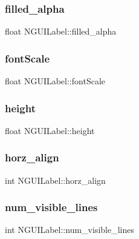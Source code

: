 \subsubsection{\texorpdfstring{filled\+\_\+alpha}{filled\_alpha}}
{\footnotesize\ttfamily float N\+G\+U\+I\+Label\+::filled\+\_\+alpha}

\hypertarget{class_n_g_u_i_label_a61a74ff519ffe248db800fa66d61d098}{}\label{class_n_g_u_i_label_a61a74ff519ffe248db800fa66d61d098} 
\subsubsection{\texorpdfstring{font\+Scale}{fontScale}}
{\footnotesize\ttfamily float N\+G\+U\+I\+Label\+::font\+Scale}

\hypertarget{class_n_g_u_i_label_a9a01323d0e84f4df900d32c06e7270c4}{}\label{class_n_g_u_i_label_a9a01323d0e84f4df900d32c06e7270c4} 
\subsubsection{\texorpdfstring{height}{height}}
{\footnotesize\ttfamily float N\+G\+U\+I\+Label\+::height}

\hypertarget{class_n_g_u_i_label_af1b9cbc5b3c81cb525d265e70b72e2e3}{}\label{class_n_g_u_i_label_af1b9cbc5b3c81cb525d265e70b72e2e3} 
\subsubsection{\texorpdfstring{horz\+\_\+align}{horz\_align}}
{\footnotesize\ttfamily int N\+G\+U\+I\+Label\+::horz\+\_\+align}

\hypertarget{class_n_g_u_i_label_ae08fde6a71a4015f873b2578e555a334}{}\label{class_n_g_u_i_label_ae08fde6a71a4015f873b2578e555a334} 
\subsubsection{\texorpdfstring{num\+\_\+visible\+\_\+lines}{num\_visible\_lines}}
{\footnotesize\ttfamily int N\+G\+U\+I\+Label\+::num\+\_\+visible\+\_\+lines}

